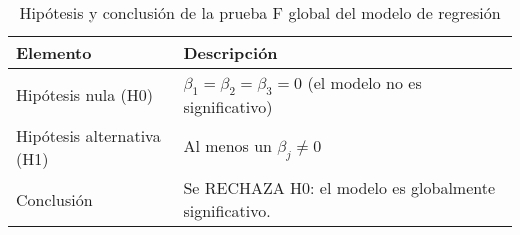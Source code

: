 \begin{table}
\caption{Hipótesis y conclusión de la prueba F global del modelo de regresión}
\label{tab:hipotesis_conclusion}
\begin{tabular}{ll}
\toprule
Elemento & Descripción \\
\midrule
Hipótesis nula (H0) & $\beta_1 = \beta_2 = \beta_3 = 0$ (el modelo no es significativo) \\
Hipótesis alternativa (H1) & Al menos un $\beta_j \neq 0$ \\
Conclusión & Se RECHAZA H0: el modelo es globalmente significativo. \\
\bottomrule
\end{tabular}
\end{table}
